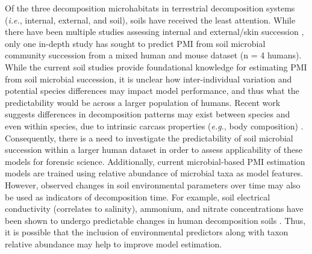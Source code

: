 \documentclass[
  10pt,
  letterpaper,
]{article}
\begin{document}
Of the three decomposition microhabitats in terrestrial decomposition
systems (\emph{i.e.}, internal, external, and soil), soils have received
the least attention. While there have been multiple studies assessing
internal and external/skin succession
\citep{pechal_potential_2014, johnson_machine_2016, metcalf_microbial_2016, liu_predicting_2020, hu_predicting_2021, belk_microbiome_2018},
only one in-depth study has sought to predict PMI from soil microbial
community succession \citep{belk_microbiome_2018} from a mixed human and
mouse dataset (n = 4 humans). While the current soil studies provide
foundational knowledge for estimating PMI from soil microbial
succession, it is unclear how inter-individual variation and potential
species differences may impact model performance, and thus what the
predictability would be across a larger population of humans. Recent
work suggests differences in decomposition patterns may exist between
species \citep{dautartas_differential_2018, debruyn_comparative_2021}
and even within species, due to intrinsic carcass properties
(\emph{e.g.}, body composition) \citep{mason_body_2022}. Consequently,
there is a need to investigate the predictability of soil microbial
succession within a larger human dataset in order to assess
applicability of these models for forensic science. Additionally,
current microbial-based PMI estimation models are trained using relative
abundance of microbial taxa as model features. However, observed changes
in soil environmental parameters over time may also be used as
indicators of decomposition time. For example, soil electrical
conductivity (correlates to salinity), ammonium, and nitrate
concentrations have been shown to undergo predictable changes in human
decomposition soils
\citep{aitkenhead-peterson_mapping_2012, fancher_evaluation_2017, taylor_high_2020}.
Thus, it is possible that the inclusion of environmental predictors
along with taxon relative abundance may help to improve model
estimation.
\end{document}
